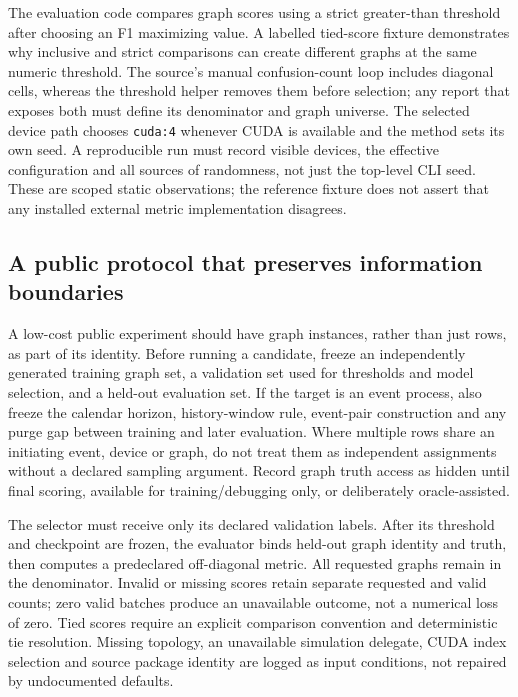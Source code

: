 The evaluation code compares graph scores using a strict greater-than threshold after choosing an
F1 maximizing value. A labelled tied-score fixture demonstrates why inclusive and strict
comparisons can create different graphs at the same numeric threshold. The source's manual
confusion-count loop includes diagonal cells, whereas the threshold helper removes them before
selection; any report that exposes both must define its denominator and graph universe. The
selected device path chooses \texttt{cuda:4} whenever CUDA is available and the method sets its own
seed. A reproducible run must record visible devices, the effective configuration and all sources
of randomness, not just the top-level CLI seed. These are scoped static observations; the reference
fixture does not assert that any installed external metric implementation disagrees.
\citep{exec28_at_tacd_protocol,exec28_at_protocol_reference}

\subsection{A public protocol that preserves information boundaries}
A low-cost public experiment should have graph instances, rather than just rows, as part of its
identity. Before running a candidate, freeze an independently generated training graph set,
a validation set used for thresholds and model selection, and a held-out evaluation set. If the
target is an event process, also freeze the calendar horizon, history-window rule, event-pair
construction and any purge gap between training and later evaluation. Where multiple rows share
an initiating event, device or graph, do not treat them as independent assignments without a
declared sampling argument. Record graph truth access as hidden until final scoring, available for
training/debugging only, or deliberately oracle-assisted.

The selector must receive only its declared validation labels. After its threshold and checkpoint
are frozen, the evaluator binds held-out graph identity and truth, then computes a predeclared
off-diagonal metric. All requested graphs remain in the denominator. Invalid or missing scores
retain separate requested and valid counts; zero valid batches produce an unavailable outcome,
not a numerical loss of zero. Tied scores require an explicit comparison convention and deterministic
tie resolution. Missing topology, an unavailable simulation delegate, CUDA index selection and
source package identity are logged as input conditions, not repaired by undocumented defaults.
\citep{exec28_at_protocol_reference}

